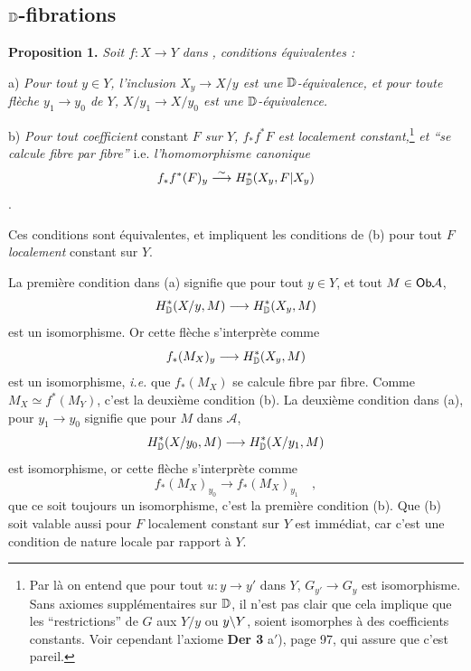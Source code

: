 
\subsection*{$\mathbb{D}$-fibrations}

\textbf{Proposition 1.} \textit{Soit $f : X \to Y$ dans} \Dia\textit{, conditions équivalentes :}

\hspace*{\parindent}a) \textit{Pour tout $y \in Y$, l'inclusion $X_y \to X/y$ est une $\mathbb{D}$-équivalence, et pour toute flèche $y_1 \to y_0$ de $Y$, $X/y_1 \to X/y_0$ est une $\mathbb{D}$-équivalence.}

\hspace*{\parindent}b) \textit{Pour tout coefficient} constant \textit{$F$ sur $Y$, $f_*f^*F$ est localement constant,}\footnote[33]{Par là on entend que pour tout $u : y \to y'$ dans $Y$, $G_{y'} \to G_y$ est isomorphisme. Sans axiomes supplémentaires sur $\mathbb{D}$, il n'est pas clair que cela implique que les ``restrictions'' de $G$ aux $Y/y$ ou $y\backslash Y$, soient isomorphes à des coefficients constants. Voir cependant l'axiome \textbf{Der 3} a$'$), page 97, qui assure que c'est pareil.} \textit{et ``se calcule fibre par fibre''} i.e. \textit{l'homomorphisme canonique}
\[
f_*f^*(F)_y \overset{\sim}{\longrightarrow} H^*_{\mathbb{D}}(X_y, F|X_y)
\]
.

Ces conditions sont équivalentes, et impliquent les conditions de (b) pour tout $F$ \textit{localement} constant sur $Y$.

La première condition dans (a) signifie que pour tout $y \in Y$, et tout $M \in \mathsf{Ob} \mathcal{A}$,
\[
H^*_{\mathbb{D}}(X/y, M) \longrightarrow H^*_{\mathbb{D}}(X_y, M)
\]
est un isomorphisme. Or cette flèche s'interprète comme
\[
f_*(M_X)_y \longrightarrow H^*_{\mathbb{D}}(X_y, M)
\]
est un isomorphisme, \textit{i.e.} que $f_*(M_X)$ se calcule fibre par fibre. Comme $M_X \simeq f^*(M_Y)$, c'est la deuxième condition (b). La deuxième condition dans (a), pour $y_1 \to y_0$ signifie que pour $M$ dans $\mathcal{A}$,
\[
H^*_{\mathbb{D}}(X/y_0, M) \longrightarrow H^*_{\mathbb{D}}(X/y_1, M)
\]
est isomorphisme, or cette flèche s'interprète comme
\[
f_*(M_X)_{y_0} \longrightarrow f_*(M_X)_{y_1} \quad ,
\]
que ce soit toujours un isomorphisme, c'est la première condition (b). Que (b) soit valable aussi pour $F$ localement constant sur $Y$ est immédiat, car c'est une condition de nature locale par rapport à $Y$.

